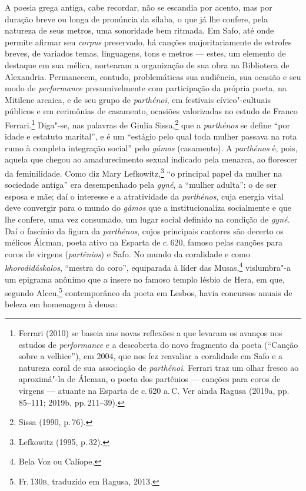  A poesia grega antiga, cabe recordar, não se
 escandia por acento, mas por duração breve ou longa de pronúncia da sílaba, o
 que já lhe confere, pela natureza de seus metros, uma sonoridade bem ritmada. Em Safo, até onde permite afirmar seu \emph{corpus} preservado,
 há canções majoritariamente de estrofes breves, de variados temas,
 linguagens, tons e metros --- estes, um elemento de destaque em sua mélica, nortearam a organização de sua obra na Biblioteca de Alexandria.
 Permanecem, contudo, problemáticas
 sua audiência, sua ocasião e seu modo de \emph{performance} presumivelmente com participação da própria poeta, na Mitilene arcaica, e de seu grupo de \emph{parthénoi}, em festivais cívico"-cultuais públicos e em cerimônias de casamento, ocasiões valorizadas no estudo de Franco Ferrari.\footnote{Ferrari (2010) se baseia nas novas reflexões a que levaram os avanços nos estudos de \emph{performance} e a descoberta do novo fragmento da poeta (``Canção sobre a velhice''), em 2004, que nos fez reavaliar a coralidade em Safo e a natureza coral de sua associação de \emph{parthénoi}. Ferrari traz um olhar fresco ao aproximá"-la de Álcman, o poeta dos partênios --- canções para coros de virgens --- atuante na Esparta de c.\,620 a.\,C. Ver ainda Ragusa (2019a, pp.\,85--111; 2019b, pp.\,211--39).}
Diga"-se, nas palavras de Giulia Sissa,\footnote{Sissa (1990, p.\,76).} que a \emph{parthénos} se define “por idade e estatuto marital”, e é um “estágio pelo qual toda mulher passava na rota rumo à completa integração social” pelo \emph{gámos} (casamento). A \emph{parthénos} é, pois, aquela que chegou ao amadurecimento sexual indicado pela menarca, ao florescer da feminilidade. Como diz Mary Lefkowitz,\footnote{Lefkowitz (1995, p.\,32).} “o principal papel da mulher na sociedade antiga” era desempenhado pela \emph{gyné}, a ``mulher adulta'': o de ser esposa e mãe; daí o interesse e a atratividade da \emph{parthénos}, cuja energia vital deve convergir para o mundo do \emph{gámos} que a institucionaliza socialmente e que lhe confere, uma vez consumado, um lugar social definido na condição de \emph{gyné.} Daí o fascínio da figura da \emph{parthénos}, cujos principais cantores são decerto os mélicos Álcman, poeta ativo na Esparta de c.\,620, famoso pelas canções para coros de virgens (\emph{partênios}) e Safo.
No mundo da coralidade e como \emph{khorodidáskalos}, ``mestra do coro'', equiparada à líder das Musas,\footnote{Bela Voz ou Calíope.} vislumbra"-a um epigrama anônimo que a insere no famoso templo lésbio de Hera, em que, segundo Alceu,\footnote{Fr.\,130\textsc{b}, traduzido em Ragusa, 2013.} contemporâneo da poeta em Lesbos, havia concursos anuais de beleza em homenagem à deusa:

